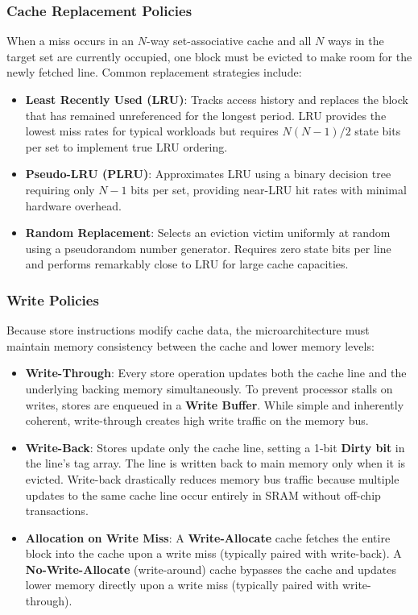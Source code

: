 \subsubsection{Cache Replacement Policies}
When a miss occurs in an $N$-way set-associative cache and all $N$ ways in the target set are currently occupied, one block must be evicted to make room for the newly fetched line. Common replacement strategies include:
\begin{itemize}
    \item \textbf{Least Recently Used (LRU)}: Tracks access history and replaces the block that has remained unreferenced for the longest period. LRU provides the lowest miss rates for typical workloads but requires $N(N-1)/2$ state bits per set to implement true LRU ordering.
    \item \textbf{Pseudo-LRU (PLRU)}: Approximates LRU using a binary decision tree requiring only $N - 1$ bits per set, providing near-LRU hit rates with minimal hardware overhead.
    \item \textbf{Random Replacement}: Selects an eviction victim uniformly at random using a pseudorandom number generator. Requires zero state bits per line and performs remarkably close to LRU for large cache capacities.
\end{itemize}

\subsubsection{Write Policies}
Because store instructions modify cache data, the microarchitecture must maintain memory consistency between the cache and lower memory levels:
\begin{itemize}
    \item \textbf{Write-Through}: Every store operation updates both the cache line and the underlying backing memory simultaneously. To prevent processor stalls on writes, stores are enqueued in a \textbf{Write Buffer}. While simple and inherently coherent, write-through creates high write traffic on the memory bus.
    \item \textbf{Write-Back}: Stores update only the cache line, setting a 1-bit \textbf{Dirty bit} in the line's tag array. The line is written back to main memory only when it is evicted. Write-back drastically reduces memory bus traffic because multiple updates to the same cache line occur entirely in SRAM without off-chip transactions.
    \item \textbf{Allocation on Write Miss}: A \textbf{Write-Allocate} cache fetches the entire block into the cache upon a write miss (typically paired with write-back). A \textbf{No-Write-Allocate} (write-around) cache bypasses the cache and updates lower memory directly upon a write miss (typically paired with write-through).
\end{itemize}

